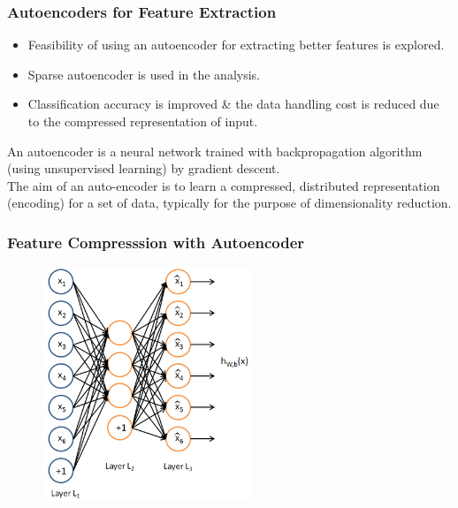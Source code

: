 \documentclass{beamer}
\begin{document}
\begin{frame}
\frametitle{Autoencoders for Feature Extraction}

\begin{itemize}
\item Feasibility of using an autoencoder for extracting better features is explored.
\item Sparse autoencoder is used in the analysis.
\item Classification accuracy is improved \& the data handling cost is reduced due to the compressed representation of input. 
\end{itemize}
An autoencoder is a neural network trained with backpropagation algorithm (using unsupervised learning) by gradient descent.\\

The aim of an auto-encoder is to learn a compressed, distributed representation (encoding) for a set of data, typically for the purpose of dimensionality reduction.
\end{frame}

\begin{frame}
\frametitle{Feature Compresssion with Autoencoder}
\begin{figure}
\includegraphics[width=0.7\linewidth, height=7cm]{figures/autoencoder}
\end{figure}
\end{frame}
\end{document}
